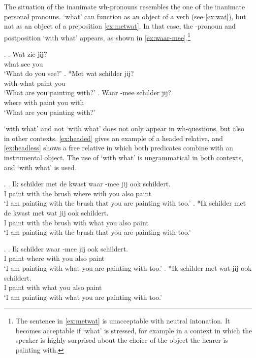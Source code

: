 \documentclass[12pt]{article}
\begin{document}
The situation of the inanimate wh-pronouns resembles the one of the inanimate personal pronouns.  `what' can function as an object of a verb (see \ref{ex:wat}), but not as an object of a preposition \ref{ex:metwat}. In that case, the -pronoun and postposition  `with what' appears, as shown in \ref{ex:waar-mee}.\footnote{The sentence in \ref{ex:metwat} is unacceptable with neutral intonation. It becomes acceptable if  `what' is stressed, for example in a context in which the speaker is highly surprised about the choice of the object the hearer is painting with.}

\ex.
\ag. Wat zie jij?\\
 what see you\\
 `What do you see?'\label{ex:wat}
\bg. *Met wat schilder jij?\\
 with what paint you\\
 `What are you painting with?'\label{ex:metwat}
\bg. Waar -mee schilder jij?\\
 where with paint you with\\
 `What are you painting with?'\label{ex:waar-mee}

 `with what' and not  `with what' does not only appear in wh-questions, but also in other contexts. \ref{ex:headed} gives an example of a headed relative, and \ref{ex:headless} shows a free relative in which both predicates combine with an instrumental object. The use of  `with what' is ungrammatical in both contexts, and  `with what' is used.

\ex.\label{ex:headed}
\ag. Ik schilder met de kwast waar -mee jij ook schildert.\\
 I paint with the brush where with you also paint\\
 `I am painting with the brush that you are painting with too.'
\bg. *Ik schilder met de kwast met wat jij ook schildert.\\
 I paint with the brush with what you also paint\\
 `I am painting with the brush that you are painting with too.'

 \ex.\label{ex:headless}
 \ag. Ik schilder waar -mee jij ook schildert.\\
  I paint where with you also paint\\
  `I am painting with what you are painting with too.'
 \bg. *Ik schilder met wat jij ook schildert.\\
  I paint with what you also paint\\
  `I am painting with what you are painting with too.'
\end{document}
